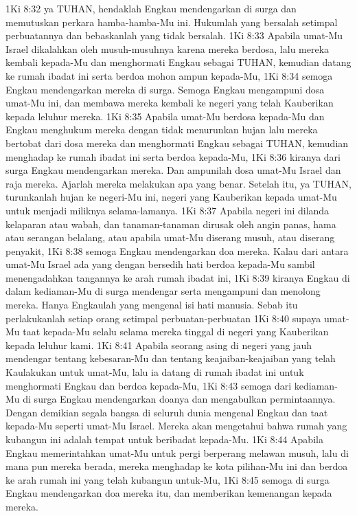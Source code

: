 1Ki 8:32  ya TUHAN, hendaklah Engkau mendengarkan di surga dan memutuskan perkara hamba-hamba-Mu ini. Hukumlah yang bersalah setimpal perbuatannya dan bebaskanlah yang tidak bersalah.
1Ki 8:33  Apabila umat-Mu Israel dikalahkan oleh musuh-musuhnya karena mereka berdosa, lalu mereka kembali kepada-Mu dan menghormati Engkau sebagai TUHAN, kemudian datang ke rumah ibadat ini serta berdoa mohon ampun kepada-Mu,
1Ki 8:34  semoga Engkau mendengarkan mereka di surga. Semoga Engkau mengampuni dosa umat-Mu ini, dan membawa mereka kembali ke negeri yang telah Kauberikan kepada leluhur mereka.
1Ki 8:35  Apabila umat-Mu berdosa kepada-Mu dan Engkau menghukum mereka dengan tidak menurunkan hujan lalu mereka bertobat dari dosa mereka dan menghormati Engkau sebagai TUHAN, kemudian menghadap ke rumah ibadat ini serta berdoa kepada-Mu,
1Ki 8:36  kiranya dari surga Engkau mendengarkan mereka. Dan ampunilah dosa umat-Mu Israel dan raja mereka. Ajarlah mereka melakukan apa yang benar. Setelah itu, ya TUHAN, turunkanlah hujan ke negeri-Mu ini, negeri yang Kauberikan kepada umat-Mu untuk menjadi miliknya selama-lamanya.
1Ki 8:37  Apabila negeri ini dilanda kelaparan atau wabah, dan tanaman-tanaman dirusak oleh angin panas, hama atau serangan belalang, atau apabila umat-Mu diserang musuh, atau diserang penyakit,
1Ki 8:38  semoga Engkau mendengarkan doa mereka. Kalau dari antara umat-Mu Israel ada yang dengan bersedih hati berdoa kepada-Mu sambil menengadahkan tangannya ke arah rumah ibadat ini,
1Ki 8:39  kiranya Engkau di dalam kediaman-Mu di surga mendengar serta mengampuni dan menolong mereka. Hanya Engkaulah yang mengenal isi hati manusia. Sebab itu perlakukanlah setiap orang setimpal perbuatan-perbuatan
1Ki 8:40  supaya umat-Mu taat kepada-Mu selalu selama mereka tinggal di negeri yang Kauberikan kepada leluhur kami.
1Ki 8:41  Apabila seorang asing di negeri yang jauh mendengar tentang kebesaran-Mu dan tentang keajaiban-keajaiban yang telah Kaulakukan untuk umat-Mu, lalu ia datang di rumah ibadat ini untuk menghormati Engkau dan berdoa kepada-Mu,
1Ki 8:43  semoga dari kediaman-Mu di surga Engkau mendengarkan doanya dan mengabulkan permintaannya. Dengan demikian segala bangsa di seluruh dunia mengenal Engkau dan taat kepada-Mu seperti umat-Mu Israel. Mereka akan mengetahui bahwa rumah yang kubangun ini adalah tempat untuk beribadat kepada-Mu.
1Ki 8:44  Apabila Engkau memerintahkan umat-Mu untuk pergi berperang melawan musuh, lalu di mana pun mereka berada, mereka menghadap ke kota pilihan-Mu ini dan berdoa ke arah rumah ini yang telah kubangun untuk-Mu,
1Ki 8:45  semoga di surga Engkau mendengarkan doa mereka itu, dan memberikan kemenangan kepada mereka.

